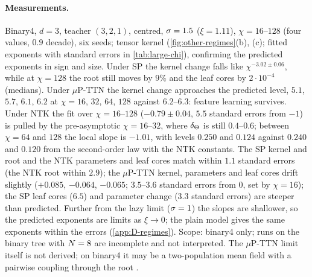 \paragraph{Measurements.}
\empirical{} Binary4, $d=3$, teacher $(3,2,1)$, centred, $\sigma=1.5$ ($\xi=1.11$), $\chi=16$--$128$ (four values,
$0.9$ decade), six seeds; tensor kernel (\cref{fig:other-regimes}(b), (c); fitted exponents with standard errors in
\cref{tab:large-chi}), confirming the predicted exponents in sign and size. Under SP the kernel change falls like
$\chi^{-3.02\pm0.06}$, while at $\chi=128$ the root still moves by $9\%$ and the leaf cores by $2\cdot10^{-4}$
(medians). Under $\mu$P-TTN the kernel change approaches the predicted level, $5.1$, $5.7$, $6.1$, $6.2$ at $\chi=16$,
$32$, $64$, $128$ against $6.2$--$6.3$: feature learning survives. Under NTK the fit over $\chi=16$--$128$
($-0.79\pm0.04$, $5.5$ standard errors from $-1$) is pulled by the pre-asymptotic $\chi=16$--$32$, where $\delta_{\Theta}$ is still
$0.4$--$0.6$; between $\chi=64$ and $128$ the local slope is $-1.01$, with levels $0.250$ and $0.124$ against $0.240$ and
$0.120$ from the second-order law with the NTK constants. The SP kernel and root and the NTK parameters and leaf
cores match within $1.1$ standard errors (the NTK root within $2.9$); the $\mu$P-TTN kernel, parameters and leaf cores
drift slightly ($+0.085$, $-0.064$, $-0.065$; $3.5$--$3.6$ standard errors from $0$, set by $\chi=16$); the SP leaf
cores ($6.5$) and parameter change ($3.3$ standard errors) are steeper than predicted. Further from the lazy limit
($\sigma=1$) the slopes are shallower, so the predicted exponents are limits as $\xi\to0$; the plain model gives the same
exponents within the errors (\cref{app:D-regimes}). Scope: binary4 only; runs on the binary tree with $N=8$ are
incomplete and not interpreted. The $\mu$P-TTN limit itself
is not derived; on binary4 it may be a two-population mean field with a pairwise coupling through the root
\conjecture.

